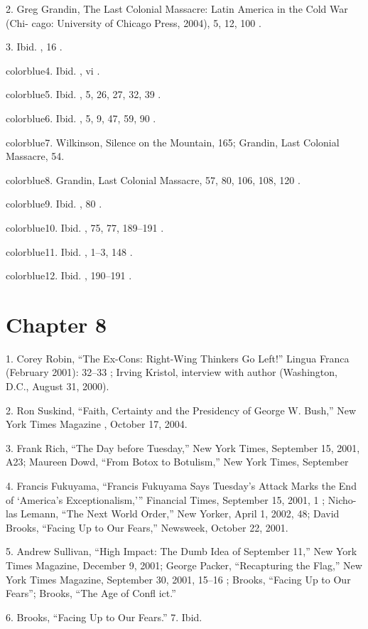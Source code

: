 	{\color{blue}2}. Greg Grandin, The Last Colonial Massacre: Latin America in the Cold War (Chi- cago: University of Chicago Press, 2004), 5, 12, 100 .


	{\color{blue}3}. Ibid. , 16 .


	{color{blue}4}. Ibid. , vi .


	{color{blue}5}. Ibid. , 5, 26, 27, 32, 39 .


	{color{blue}6}. Ibid. , 5, 9, 47, 59, 90 .


	{color{blue}7}. Wilkinson, Silence on the Mountain, 165; Grandin, Last Colonial Massacre, 54.


	{color{blue}8}. Grandin, Last Colonial Massacre, 57, 80, 106, 108, 120 .


	{color{blue}9}. Ibid. , 80 .


	{color{blue}10}. Ibid. , 75, 77, 189–191 .


	{color{blue}11}. Ibid. , 1–3, 148 .


	{color{blue}12}. Ibid. , 190–191 .


\section{Chapter 8}


	{\color{blue}1}. Corey Robin, “The Ex-Cons: Right-Wing Thinkers Go Left!” Lingua Franca (February 2001): 32–33 ; Irving Kristol, interview with author (Washington, D.C., August 31, 2000).


	{\color{blue}2}. Ron Suskind, “Faith, Certainty and the Presidency of George W. Bush,” New York Times Magazine , October 17, 2004.


	{\color{blue}3}. Frank Rich, “The Day before Tuesday,” New York Times, September 15, 2001, A23; Maureen Dowd, “From Botox to Botulism,” New York Times, September


	{\color{blue}4}. Francis Fukuyama, “Francis Fukuyama Says Tuesday’s Attack Marks the End of ‘America’s Exceptionalism,’” Financial Times, September 15, 2001, 1 ; Nicho- las Lemann, “The Next World Order,” New Yorker, April 1, 2002, 48; David Brooks, “Facing Up to Our Fears,” Newsweek, October 22, 2001.


	{\color{blue}5}. Andrew Sullivan, “High Impact: The Dumb Idea of September 11,” New York Times Magazine, December 9, 2001; George Packer, “Recapturing the Flag,” New York Times Magazine, September 30, 2001, 15–16 ; Brooks, “Facing Up to Our Fears”; Brooks, “The Age of Confl ict.”


	{\color{blue}6}. Brooks, “Facing Up to Our Fears.” 7. Ibid.


